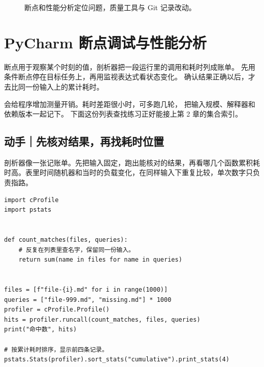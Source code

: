\documentclass[UTF8,a4paper,oneside,openany,fontset=none,11pt]{ctexbook}
\newcommand{\code}[1]{\texttt{\detokenize{#1}}}
\begin{document}
\begin{figure}[htbp]
  \centering
  \caption*{断点和性能分析定位问题，质量工具与 Git 记录改动。}
\end{figure}


\section{PyCharm 断点调试与性能分析}

断点用于观察某个时刻的值，剖析器把一段运行里的调用和耗时列成账单。
先用条件断点停在目标任务上，再用监视表达式看状态变化。
确认结果正确以后，才去比同一份输入上的累计耗时。

\code{cProfile} 会给程序增加测量开销。耗时差距很小时，可多跑几轮，
把输入规模、解释器和依赖版本一起记下。
下面这份列表查找练习正好能接上第 2 章的集合索引。

\subsection*{动手｜先核对结果，再找耗时位置}

剖析器像一张记账单。先把输入固定，跑出能核对的结果，再看哪几个函数累积耗时高。表里时间随机器和当时的负载变化，在同样输入下重复比较，单次数字只负责指路。

\begin{lstlisting}[title={\code{profile_lookup.py}}]
import cProfile
import pstats


def count_matches(files, queries):
    # 反复在列表里查名字，保留同一份输入。
    return sum(name in files for name in queries)


files = [f"file-{i}.md" for i in range(1000)]
queries = ["file-999.md", "missing.md"] * 1000
profiler = cProfile.Profile()
hits = profiler.runcall(count_matches, files, queries)
print("命中数", hits)

# 按累计耗时排序，显示前四条记录。
pstats.Stats(profiler).sort_stats("cumulative").print_stats(4)
\end{lstlisting}
\end{document}
